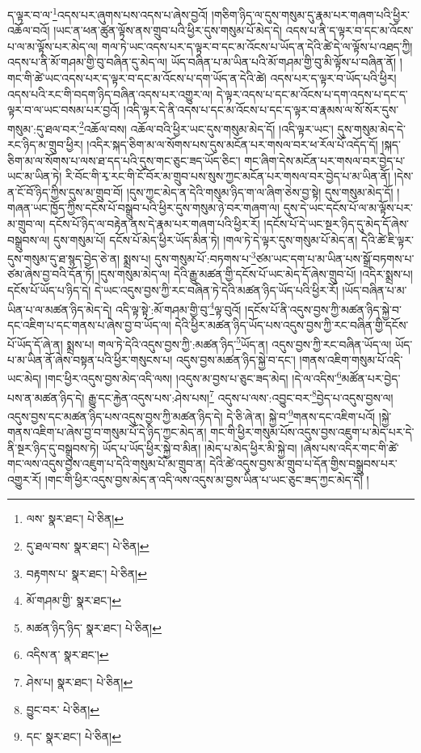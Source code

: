 ད་ལྟར་བ་ལ་\footnote{ལས་  སྣར་ཐང་།  པེ་ཅིན། }འདས་པར་ཞུགས་པས་འདས་པ་ཞེས་བྱའོ། །གཅིག་ཉིད་ལ་དུས་གསུམ་དུ་རྣམ་པར་གཞག་པའི་ཕྱིར་འཆོལ་བའོ། །ཡང་ན་ཕན་ཚུན་ལྟོས་ནས་གྲུབ་པའི་ཕྱིར་དུས་གསུམ་པོ་མེད་དེ། འདས་པ་ནི་ད་ལྟར་བ་དང་མ་འོངས་པ་ལ་མ་ལྟོས་པར་མེད་ལ། གལ་ཏེ་ཡང་འདས་པར་ད་ལྟར་བ་དང་མ་འོངས་པ་ཡོད་ན་དེའི་ཚེ་དེ་ལ་ལྟོས་པ་འཐད་ཀྱི། འདས་པ་ནི་མོ་གཤམ་གྱི་བུ་བཞིན་དུ་མེད་ལ། ཡོད་བཞིན་པ་མ་ཡིན་པའི་མོ་གཤམ་གྱི་བུ་མི་ལྟོས་པ་བཞིན་ནོ། །གང་གི་ཚེ་ཡང་འདས་པར་ད་ལྟར་བ་དང་མ་འོངས་པ་དག་ཡོད་ན་དེའི་ཚེ། འདས་པར་ད་ལྟར་བ་ཡོད་པའི་ཕྱིར། འདས་པའི་རང་གི་བདག་ཉིད་བཞིན་འདས་པར་འགྱུར་ལ། དེ་ལྟར་འདས་པ་དང་མ་འོངས་པ་དག་འདས་པ་དང་ད་ལྟར་བ་ལ་ཡང་བསམ་པར་བྱའོ། །འདི་ལྟར་དེ་ནི་འདས་པ་དང་མ་འོངས་པ་དང་ད་ལྟར་བ་རྣམས་ལ་སོ་སོར་དུས་གསུམ་:དུ་ཐལ་བར་\footnote{དུ་ཐལ་བས་  སྣར་ཐང་།  པེ་ཅིན། }འཆོལ་བས། འཆོལ་བའི་ཕྱིར་ཡང་དུས་གསུམ་མེད་དོ། །འདི་ལྟར་ཡང་། དུས་གསུམ་མེད་དེ་རང་ཉིད་མ་གྲུབ་ཕྱིར། །འདིར་སྐད་ཅིག་མ་ལ་སོགས་པས་དུས་མངོན་པར་གསལ་བར་ཕ་རོལ་པོ་འདོད་དོ། །སྐད་ཅིག་མ་ལ་སོགས་པ་ལས་ཐ་དད་པའི་དུས་གང་ཅུང་ཟད་ཡོད་ཅིང་། གང་ཞིག་དེས་མངོན་པར་གསལ་བར་བྱེད་པ་ཡང་མ་ཡིན་ཏེ། རི་བོང་གི་རྭ་རང་གི་ངོ་བོར་མ་གྲུབ་པས་སུས་ཀྱང་མངོན་པར་གསལ་བར་བྱེད་པ་མ་ཡིན་ནོ། །དེས་ན་ངོ་བོ་ཉིད་ཀྱིས་དུས་མ་གྲུབ་བོ། །དུས་ཀྱང་མེད་ན་དེའི་གསུམ་ཉིད་ག་ལ་ཞིག་ཅེས་བྱ་སྟེ། དུས་གསུམ་མེད་དོ། །གཞན་ཡང་ཁྱོད་ཀྱིས་དངོས་པོ་བསྒྲུབ་པའི་ཕྱིར་དུས་གསུམ་ཉེ་བར་གཞག་ལ། དུས་དེ་ཡང་དངོས་པོ་ལ་མ་ལྟོས་པར་མ་གྲུབ་ལ། དངོས་པོ་ཉིད་ལ་བརྟེན་ནས་དེ་རྣམ་པར་གཞག་པའི་ཕྱིར་རོ། །དངོས་པོ་དེ་ཡང་སྔར་ཉིད་དུ་མེད་དོ་ཞེས་བསྒྲུབས་ལ། དུས་གསུམ་པོ། དངོས་པོ་མེད་ཕྱིར་ཡོད་མིན་ཏེ། །གལ་ཏེ་དེ་ལྟར་དུས་གསུམ་པོ་མེད་ན། དེའི་ཚེ་ཇི་ལྟར་དུས་གསུམ་དུ་ཐ་སྙད་བྱེད་ཅེ་ན། སྨྲས་པ། དུས་གསུམ་པོ་:བཏགས་པ་\footnote{བརྟགས་པ་  སྣར་ཐང་།  པེ་ཅིན། }ཙམ་ཡང་དག་པ་མ་ཡིན་པས་སྒྲོ་བཏགས་པ་ཙམ་ཞེས་བྱ་བའི་དོན་ཏོ། །དུས་གསུམ་མེད་ལ། དེའི་རྒྱུ་མཚན་གྱི་དངོས་པོ་ཡང་མེད་དོ་ཞེས་གྲུབ་པོ། །འདིར་སྨྲས་པ། དངོས་པོ་ཡོད་པ་ཉིད་དེ། དེ་ཡང་འདུས་བྱས་ཀྱི་རང་བཞིན་ཏེ་དེའི་མཚན་ཉིད་ཡོད་པའི་ཕྱིར་རོ། །ཡོད་བཞིན་པ་མ་ཡིན་པ་ལ་མཚན་ཉིད་མེད་དེ། འདི་ལྟ་སྟེ་:མོ་གཤམ་གྱི་བུ་\footnote{མོ་གཤམ་གྱི་  སྣར་ཐང་། }ལྟ་བུའོ། །དངོས་པོ་ནི་འདུས་བྱས་ཀྱི་མཚན་ཉིད་སྐྱེ་བ་དང་འཇིག་པ་དང་གནས་པ་ཞེས་བྱ་བ་ཡོད་ལ། དེའི་ཕྱིར་མཚན་ཉིད་ཡོད་པས་འདུས་བྱས་ཀྱི་རང་བཞིན་གྱི་དངོས་པོ་ཡོད་དོ་ཞེ་ན། སྨྲས་པ། གལ་ཏེ་དེའི་འདུས་བྱས་ཀྱི་:མཚན་ཉིད་\footnote{མཚན་ཉིད་ཉིད་  སྣར་ཐང་།  པེ་ཅིན། }ཡོད་ན། འདུས་བྱས་ཀྱི་རང་བཞིན་ཡོད་ལ། ཡོད་པ་མ་ཡིན་ནོ་ཞེས་བསྟན་པའི་ཕྱིར་གསུངས་པ། འདུས་བྱས་མཚན་ཉིད་སྐྱེ་བ་དང་། །གནས་འཇིག་གསུམ་པོ་འདི་ཡང་མེད། །གང་ཕྱིར་འདུས་བྱས་མེད་འདི་ལས། །འདུས་མ་བྱས་པ་ཅུང་ཟད་མེད། །དེ་ལ་འདིས་\footnote{འདིས་ན་  སྣར་ཐང་། }མཚོན་པར་བྱེད་པས་ན་མཚན་ཉིད་དེ། རྒྱུ་དང་རྐྱེན་འདུས་པས་:ཤེས་པས།\footnote{ཤེས་པ།  སྣར་ཐང་།  པེ་ཅིན། } འདུས་པ་ལས་:འབྱུང་བར་\footnote{བྱུང་བར་  པེ་ཅིན། }བྱེད་པ་འདུས་བྱས་ལ། འདུས་བྱས་དང་མཚན་ཉིད་པས་འདུས་བྱས་ཀྱི་མཚན་ཉིད་དེ། དེ་ཅི་ཞེ་ན། སྐྱེ་བ་\footnote{དང་  སྣར་ཐང་།  པེ་ཅིན། }གནས་དང་འཇིག་པའོ། །སྐྱེ་གནས་འཇིག་པ་ཞེས་བྱ་བ་གསུམ་པོ་དེ་ཉིད་ཀྱང་མེད་ན། གང་གི་ཕྱིར་གསུམ་པོས་འདུས་བྱས་འཇུག་པ་མེད་པར་དེ་ནི་སྔར་ཉིད་དུ་བསྒྲུབས་ཏེ། ཡོད་པ་ཡོད་ཕྱིར་སྐྱེ་བ་མིན། །མེད་པ་མེད་ཕྱིར་མི་སྐྱེ་བ། །ཞེས་པས་འདིར་གང་གི་ཚེ་གང་ལས་འདུས་བྱས་འཇུག་པ་དེའི་གསུམ་པོ་མ་གྲུབ་ན། དེའི་ཚེ་འདུས་བྱས་མ་གྲུབ་པ་དོན་གྱིས་བསྒྲུབས་པར་འགྱུར་རོ། །གང་གི་ཕྱིར་འདུས་བྱས་མེད་ན་འདི་ལས་འདུས་མ་བྱས་ཡིན་པ་ཡང་ཅུང་ཟད་ཀྱང་མེད་དོ། །
